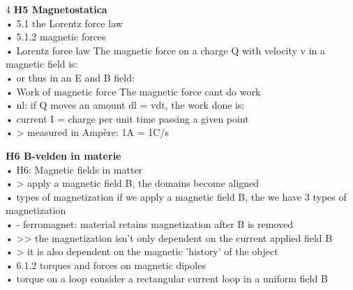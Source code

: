 \documentclass[8pt,a4paper]{article}
\begin{document}
\begin{multicols*}{4}
\textbf{H5 Magnetostatica}\\
• 5.1 the Lorentz force law\\
• 5.1.2 magnetic forces\\
• Lorentz force law The magnetic force on a charge Q with velocity v in a magnetic field is:\\
• or thus in an E and B field:\\
• Work of magnetic force The magnetic force cant do work\\
• nl: if Q moves an amount dl = vdt, the work done is:\\
• current I = charge per unit time passing a given point\\
• > measured in Ampère: 1A = 1C/s\\
\columnbreak

\textbf{H6 B-velden in materie}\\
• H6: Magnetic fields in matter\\
• > apply a magnetic field B, the domains become aligned\\
• types of magnetization if we apply a magnetic field B, the we have 3 types of magnetization\\
• - ferromagnet: material retains magnetization after B is removed\\
• >> the magnetization isn't only dependent on the current applied field B\\
• > it is also dependent on the magnetic 'history' of the object\\
• 6.1.2 torques and forces on magnetic dipoles\\
• torque on a loop consider a rectangular current loop in a uniform field B\\
\columnbreak


\end{multicols*}

\vspace*{-10pt}
\newpage
\end{document}
